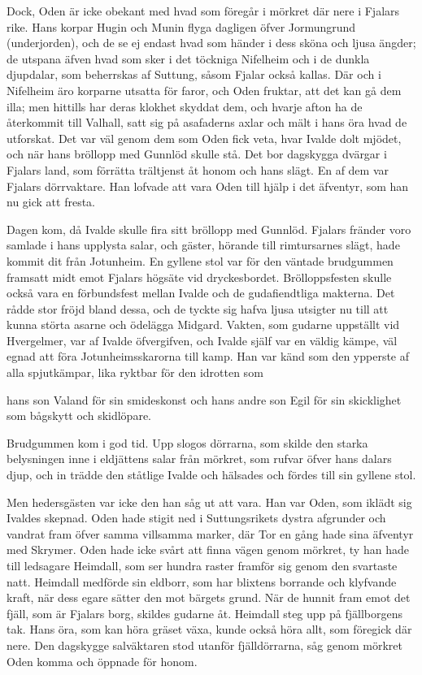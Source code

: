 Dock, Oden är icke obekant med hvad som föregår i mörkret där nere i
Fjalars rike. Hans korpar Hugin och Munin flyga dagligen öfver
Jormungrund (underjorden), och de se ej endast hvad som händer i dess
sköna och ljusa ängder; de utspana äfven hvad som sker i det töckniga
Nifelheim och i de dunkla djupdalar, som beherrskas af Suttung, såsom
Fjalar också kallas. Där och i Nifelheim äro korparne utsatta för faror,
och Oden fruktar, att det kan gå dem illa; men hittills har deras
klokhet skyddat dem, och hvarje afton ha de återkommit till Valhall,
satt sig på asafaderns axlar och mält i hans öra hvad de utforskat. Det
var väl genom dem som Oden fick veta, hvar Ivalde dolt mjödet, och när
hans bröllopp med Gunnlöd skulle stå. Det bor dagskygga dvärgar i
Fjalars land, som förrätta trältjenst åt honom och hans slägt. En af dem
var Fjalars dörrvaktare. Han lofvade att vara Oden till hjälp i det
äfventyr, som han nu gick att fresta.

Dagen kom, då Ivalde skulle fira sitt bröllopp med Gunnlöd. Fjalars
fränder voro samlade i hans upplysta salar, och gäster, hörande till
rimtursarnes slägt, hade kommit dit från Jotunheim. En gyllene stol var
för den väntade brudgummen framsatt midt emot Fjalars högsäte vid
dryckesbordet. Brölloppsfesten skulle också vara en förbundsfest mellan
Ivalde och de gudafiendtliga makterna. Det rådde stor fröjd bland dessa,
och de tyckte sig hafva ljusa utsigter nu till att kunna störta asarne
och ödelägga Midgard. Vakten, som gudarne uppställt vid Hvergelmer, var
af Ivalde öfvergifven, och Ivalde själf var en väldig kämpe, väl egnad
att föra Jotunheimsskarorna till kamp. Han var känd som den ypperste af
alla spjutkämpar, lika ryktbar för den idrotten som

hans son Valand för sin smideskonst och hans andre son Egil för sin
skicklighet som bågskytt och skidlöpare.

Brudgummen kom i god tid. Upp slogos dörrarna, som skilde den starka
belysningen inne i eldjättens salar från mörkret, som rufvar öfver hans
dalars djup, och in trädde den ståtlige Ivalde och hälsades och fördes
till sin gyllene stol.

Men hedersgästen var icke den han såg ut att vara. Han var Oden, som
iklädt sig Ivaldes skepnad. Oden hade stigit ned i Suttungsrikets dystra
afgrunder och vandrat fram öfver samma villsamma marker, där Tor en gång
hade sina äfventyr med Skrymer. Oden hade icke svårt att finna vägen
genom mörkret, ty han hade till ledsagare Heimdall, som ser hundra
raster framför sig genom den svartaste natt. Heimdall medförde sin
eldborr, som har blixtens borrande och klyfvande kraft, när dess egare
sätter den mot bärgets grund. När de hunnit fram emot det fjäll, som är
Fjalars borg, skildes gudarne åt. Heimdall steg upp på fjällborgens tak.
Hans öra, som kan höra gräset växa, kunde också höra allt, som föregick
där nere. Den dagskygge salväktaren stod utanför fjälldörrarna, såg
genom mörkret Oden komma och öppnade för honom.

